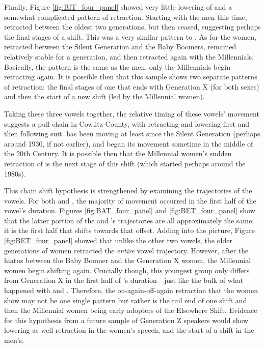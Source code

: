 Finally, Figure \ref{fig:BIT_four_panel} showed very little lowering of \bit and a somewhat complicated pattern of retraction. Starting with the men this time, \bit retracted between the oldest two generations, but then ceased, suggesting perhaps the final stages of a shift. This was a very similar pattern to \bet. As for the women, \bit retracted between the Silent Generation and the Baby Boomers, remained relatively stable for a generation, and then retracted again with the Millennials. Basically, the pattern is the same as the men, only the Millennials begin retracting again. It is possible then that this sample shows two separate patterns of retraction: the final stages of one that ends with Generation X (for both sexes) and then the start of a new shift (led by the Millennial women).

Taking these three vowels together, the relative timing of these vowels' movement suggests a pull chain in Cowlitz County, with \bat retracting and lowering first and then \bet following suit. \bat has been moving at least since the Silent Generation (perhaps around 1930, if not earlier), and \bet began its movement sometime in the middle of the 20th Century. It is possible then that the Millennial women's sudden retraction of \bit is the next stage of this shift (which started perhaps around the 1980s).

This chain shift hypothesis is strengthened by examining the trajectories of the vowels. For both \bat and \bet, the majority of movement occurred in the first half of the vowel's duration. Figures \ref{fig:BAT_four_panel} and \ref{fig:BET_four_panel} show that the latter portion of the \bat and \bet's trajectories are all approximately the same: it is the first half that shifts towards that offset. Adding \bit into the picture, Figure \ref{fig:BET_four_panel} showed that unlike the other two vowels, the older generations of women retracted the \textit{entire} vowel trajectory. However, after the hiatus between the Baby Boomer and the Generation X women, the Millennial women begin shifting again. Crucially though, this youngest group only differs from Generation X in the first half of \bit's duration---just like the bulk of what happened with \bet and \bat. Therefore, the on-again-off-again \bit retraction that the women show may not be one single pattern but rather is the tail end of one shift and then the Millennial women being early adopters of the Elsewhere Shift. Evidence for this hypothesis from a future sample of Generation Z speakers would show lowering as well retraction in the women's speech, and the start of a shift in the men's.

